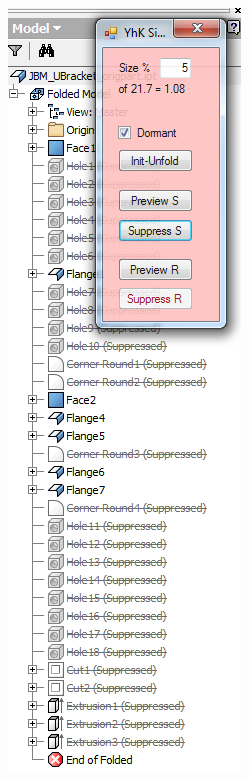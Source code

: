 \begin{minipage}{\linewidth}
\begin{minipage}[c]{0.62\linewidth}
\end{minipage}
\quad
\begin{minipage}[c]{0.3\linewidth}
\includegraphics[width=\linewidth,valign=t]{../Common/images/JBM_UBracket_Defeatured_tree}
 \label{fig:results:JBM_UBracket_Defeatured_tree}
\end{minipage}
\end{minipage}

